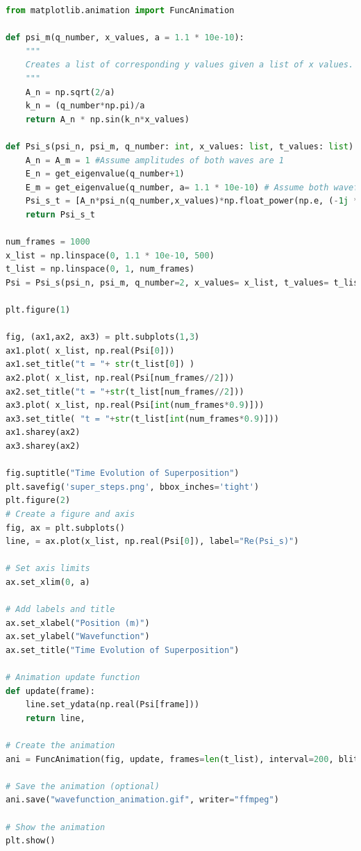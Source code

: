 \documentclass[a4paper,12pt]{article}
\begin{document}
\begin{lstlisting}[language=Python, caption= Code used to plot findings]
from matplotlib.animation import FuncAnimation

def psi_m(q_number, x_values, a = 1.1 * 10e-10):
    """
    Creates a list of corresponding y values given a list of x values.
    """
    A_n = np.sqrt(2/a)
    k_n = (q_number*np.pi)/a
    return A_n * np.sin(k_n*x_values)

def Psi_s(psi_n, psi_m, q_number: int, x_values: list, t_values: list):
    A_n = A_m = 1 #Assume amplitudes of both waves are 1
    E_n = get_eigenvalue(q_number+1)
    E_m = get_eigenvalue(q_number, a= 1.1 * 10e-10) # Assume both wavefunctions have the same quantum number
    Psi_s_t = [A_n*psi_n(q_number,x_values)*np.float_power(np.e, (-1j * E_n * t / constants.hbar )) + A_m*psi_m(q_number,x_values)*np.float_power(np.e, (-1j * E_m * t / constants.hbar )) for t in t_values]
    return Psi_s_t

num_frames = 1000
x_list = np.linspace(0, 1.1 * 10e-10, 500)
t_list = np.linspace(0, 1, num_frames)
Psi = Psi_s(psi_n, psi_m, q_number=2, x_values= x_list, t_values= t_list)

plt.figure(1)

fig, (ax1,ax2, ax3) = plt.subplots(1,3)
ax1.plot( x_list, np.real(Psi[0]))
ax1.set_title("t = "+ str(t_list[0]) )
ax2.plot( x_list, np.real(Psi[num_frames//2]))
ax2.set_title("t = "+str(t_list[num_frames//2]))
ax3.plot( x_list, np.real(Psi[int(num_frames*0.9)]))
ax3.set_title( "t = "+str(t_list[int(num_frames*0.9)]))
ax1.sharey(ax2)
ax3.sharey(ax2)

fig.suptitle("Time Evolution of Superposition")
plt.savefig('super_steps.png', bbox_inches='tight')
plt.figure(2)
# Create a figure and axis
fig, ax = plt.subplots()
line, = ax.plot(x_list, np.real(Psi[0]), label="Re(Psi_s)")

# Set axis limits
ax.set_xlim(0, a)

# Add labels and title
ax.set_xlabel("Position (m)")
ax.set_ylabel("Wavefunction")
ax.set_title("Time Evolution of Superposition")

# Animation update function
def update(frame):
    line.set_ydata(np.real(Psi[frame]))
    return line,

# Create the animation
ani = FuncAnimation(fig, update, frames=len(t_list), interval=200, blit=True)

# Save the animation (optional)
ani.save("wavefunction_animation.gif", writer="ffmpeg")

# Show the animation
plt.show()

\end{lstlisting}
\end{document}
